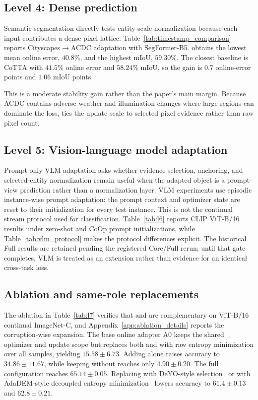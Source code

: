 \subsection{Level 4: Dense prediction}


Semantic segmentation directly tests entity-scale normalization because each input contributes a dense pixel lattice. Table~\ref{tab:timestamp_comparison} reports Cityscapes$\rightarrow$ACDC adaptation with SegFormer-B5. \method{} obtains the lowest mean online error, $40.8\%$, and the highest mIoU, $59.30\%$. The closest baseline is CoTTA with $41.5\%$ online error and $58.24\%$ mIoU, so the gain is $0.7$ online-error points and $1.06$ mIoU points.

This is a moderate stability gain rather than the paper's main margin. Because ACDC contains adverse weather and illumination changes where large regions can dominate the loss, \sane{} ties the update scale to selected pixel evidence rather than raw pixel count.

\subsection{Level 5: Vision-language model adaptation}



Prompt-only VLM adaptation asks whether evidence selection, anchoring, and selected-entity normalization remain useful when the adapted object is a prompt-view prediction rather than a normalization layer. VLM experiments use episodic instance-wise prompt adaptation: the prompt context and optimizer state are reset to their initialization for every test instance. This is not the continual stream protocol used for classification. Table~\ref{tab:l6} reports CLIP ViT-B/16 results under zero-shot and CoOp prompt initializations, while Table~\ref{tab:vlm_protocol} makes the protocol differences explicit. The historical Full results are retained pending the registered Core/Full rerun; until that gate completes, VLM is treated as an extension rather than evidence for an identical cross-task loss.

\subsection{Ablation and same-role replacements}



The ablation in Table~\ref{tab:l7} verifies that \core{} and \care{} are complementary on ViT-B/16 continual ImageNet-C, and Appendix~\ref{app:ablation_details} reports the corruption-wise expansion. The base online adapter A0 keeps the shared optimizer and update scope but replaces both \core{} and \care{} with raw entropy minimization over all samples, yielding $15.58\pm6.73$. Adding \core{} alone raises accuracy to $34.86\pm11.67$, while keeping \care{} without \core{} reaches only $4.90\pm0.20$. The full configuration reaches $65.14\pm0.05$. Replacing \core{} with DeYO-style selection~\cite{lee2024deyo} or \care{} with AdaDEM-style decoupled entropy minimization~\cite{ma2025adadem} lowers accuracy to $61.4\pm0.13$ and $62.8\pm0.21$.

